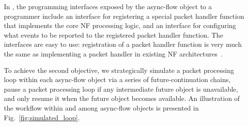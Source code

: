 
In \netstar, the programming interfaces exposed by the async-flow object to a programmer include an interface for registering a special packet handler function that implements the core NF processing logic, and an interface for configuring what events to be reported to the registered packet handler function. %
 The interfaces are easy to use: registration of a packet handler function %
 is very much the same as implementing a packet handler in existing NF architectures~\cite{bro, snort}.


To achieve the second objective, we strategically simulate a packet processing loop within each async-flow object via a series of future-continuation chains, pause a packet processing loop if any intermediate future object is unavailable, and only resume it when the future object becomes available. %
An illustration of the workflow within and among async-flow objects is presented in Fig.~\ref{fig:simulated_loop}.



